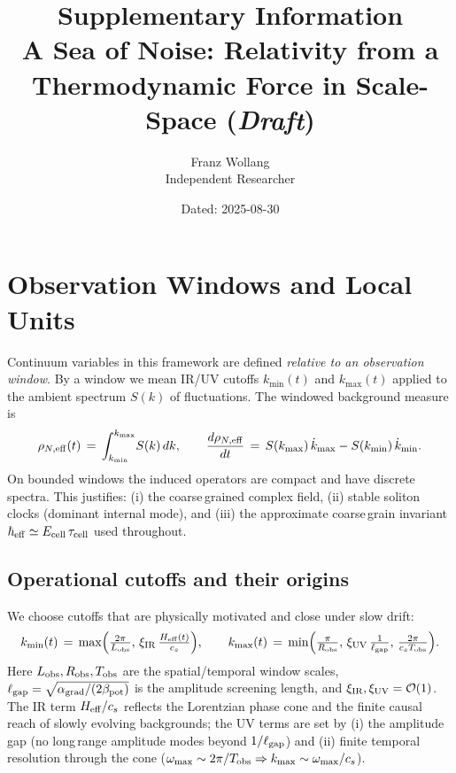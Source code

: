 \documentclass[11pt]{article}
\title{Supplementary Information\\A Sea of Noise: Relativity from a Thermodynamic Force in Scale-Space (\textit{Draft})}
\author{Franz Wollang\\ \small Independent Researcher}
\date{\small Dated: 2025-08-30}
\begin{document}
\maketitle

\begin{center}
\setlength{\fboxsep}{8pt}%
\end{center}
\vspace{1em}

\tableofcontents
\vspace{1em}

\section{Observation Windows and Local Units}\label{si:window}
Continuum variables in this framework are defined \emph{relative to an observation window}. By a window we mean IR/UV cutoffs $k_{\min}(t)$ and $k_{\max}(t)$ applied to the ambient spectrum $S(k)$ of fluctuations. The windowed background measure is
\begin{equation}
  \rho_{N,\rm eff}(t) \,=\, \int_{k_{\min}}^{k_{\max}} \! S(k)\,dk,\qquad \frac{d\rho_{N,\rm eff}}{dt} \,=\, S(k_{\max})\,\dot k_{\max} - S(k_{\min})\,\dot k_{\min}.
\end{equation}
On bounded windows the induced operators are compact and have discrete spectra. This justifies: (i) the coarse\,grained complex field, (ii) stable soliton clocks (dominant internal mode), and (iii) the approximate coarse\,grain invariant $\hbar_{\rm eff}\simeq E_{\rm cell}\,\tau_{\rm cell}$ used throughout.

\subsection*{Operational cutoffs and their origins}
We choose cutoffs that are physically motivated and close under slow drift:
\begin{equation}
  k_{\min}(t) \,=\, \max\!\Big(\tfrac{2\pi}{L_{\rm obs}},\, \xi_{\rm IR}\,\tfrac{H_{\rm eff}(t)}{c_s}\Big),\qquad
  k_{\max}(t) \,=\, \min\!\Big(\tfrac{\pi}{R_{\rm obs}},\, \xi_{\rm UV}\,\tfrac{1}{\ell_{\rm gap}},\, \tfrac{2\pi}{c_s T_{\rm obs}}\Big).
\end{equation}
Here $L_{\rm obs},R_{\rm obs},T_{\rm obs}$ are the spatial/temporal window scales, $\ell_{\rm gap}=\sqrt{\alpha_{\rm grad}/(2\beta_{\rm pot})}$ is the amplitude screening length, and $\xi_{\rm IR},\xi_{\rm UV}=\mathcal O(1)$. The IR term $H_{\rm eff}/c_s$ reflects the Lorentzian phase cone and the finite causal reach of slowly evolving backgrounds; the UV terms are set by (i) the amplitude gap (no long\,range amplitude modes beyond $1/\ell_{\rm gap}$) and (ii) finite temporal resolution through the cone ($\omega_{\max}\sim 2\pi/T_{\rm obs}\Rightarrow k_{\max}\sim \omega_{\max}/c_s$).
\end{document}
